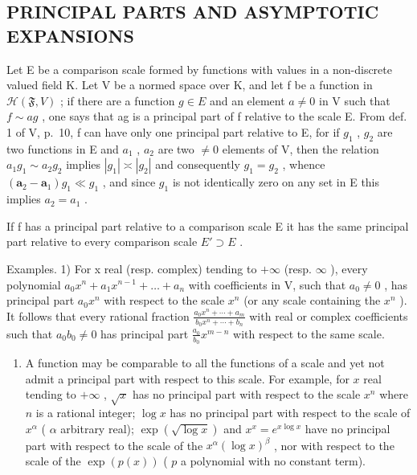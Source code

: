 \subsection{PRINCIPAL PARTS AND ASYMPTOTIC EXPANSIONS}

Let E be a comparison scale formed by functions with values in a non-discrete valued field K. Let V be a normed space over K, and let f be a function in \(\mathcal{H}(\mathfrak{F}, V)\) ; if there are a function \(g \in E\) and an element \(a \neq 0\) in V such that \(f \sim ag\) , one says that ag is a principal part of f relative to the scale E. From def. 1 of V, p.~10, f can have only one principal part relative to E, for if \(g_{1}\) , \(g_{2}\) are two functions in E and \(a_{1}\) , \(a_{2}\) are two \(\neq 0\) elements of V, then the relation \(a_{1}g_{1} \sim a_{2}g_{2}\) implies \(|g_{1}| \asymp |g_{2}|\) and consequently \(g_{1} = g_{2}\) , whence \((\mathbf{a}_{2} - \mathbf{a}_{1})g_{1} \ll g_{1}\) , and since \(g_{1}\) is not identically zero on any set in E this implies \(a_{2} = a_{1}\) .

If f has a principal part relative to a comparison scale E it has the same principal part relative to every comparison scale \(E' \supset E\) .

Examples. 1) For x real (resp. complex) tending to \(+\infty\) (resp. \(\infty\) ), every polynomial \(a_{0}x^{n} + a_{1}x^{n-1} + \ldots + a_{n}\) with coefficients in V, such that \(a_{0} \neq 0\) , has principal part \(a_{0}x^{n}\) with respect to the scale \(x^{n}\) (or any scale containing the \(x^{n}\) ). It follows that every rational fraction \(\frac{a_{0}x^{n} + \cdots + a_{m}}{b_{0}x^{n} + \cdots + b_{n}}\) with real or complex coefficients such that \(a_{0}b_{0} \neq 0\) has principal part \(\frac{a_{0}}{b_{0}}x^{m-n}\) with respect to the same scale.

\begin{enumerate}
\def\labelenumi{\arabic{enumi})}
\setcounter{enumi}{1}
\tightlist
\item
  A function may be comparable to all the functions of a scale and yet not admit a principal part with respect to this scale. For example, for \(x\) real tending to \(+\infty\) , \(\sqrt{x}\) has no principal part with respect to the scale \(x^n\) where \(n\) is a rational integer; \(\log x\) has no principal part with respect to the scale of \(x^\alpha\) ( \(\alpha\) arbitrary real); \(\exp(\sqrt{\log x})\) and \(x^x = e^{x\log x}\) have no principal part with respect to the scale of the \(x^\alpha (\log x)^\beta\) , nor with respect to the scale of the \(\exp(p(x))\) ( \(p\) a polynomial with no constant term).
\end{enumerate}

